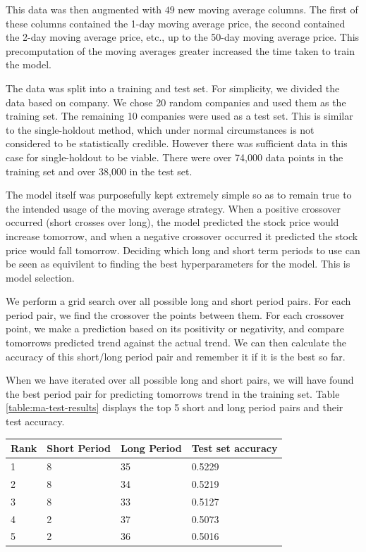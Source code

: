 \documentclass{report}
\begin{document}
This data was then augmented with $49$ new moving average columns. The first of these columns contained the 1-day moving average price, the second contained the 2-day moving average price, etc., up to the 50-day moving average price. This precomputation of the moving averages greater increased the time taken to train the model.

The data was split into a training and test set. For simplicity, we divided the data based on company. We chose 20 random companies and used them as the training set. The remaining 10 companies were used as a test set. This is similar to the single-holdout method, which under normal circumstances is not considered to be statistically credible. However there was sufficient data in this case for single-holdout to be viable. There were over 74,000 data points in the training set and over 38,000 in the test set.

The model itself was purposefully kept extremely simple so as to remain true to the intended usage of the moving average strategy. When a positive crossover occurred (short crosses over long), the model predicted the stock price would increase tomorrow, and when a negative crossover occurred it predicted the stock price would fall tomorrow. Deciding which long and short term periods to use can be seen as equivilent to finding the best hyperparameters for the model. This is model selection.

We perform a grid search over all possible long and short period pairs. For each period pair, we find the crossover the points between them. For each crossover point, we make a prediction based on its positivity or negativity, and compare tomorrows predicted trend against the actual trend. We can then calculate the accuracy of this short/long period pair and remember it if it is the best so far.

When we have iterated over all possible long and short pairs, we will have found the best period pair for predicting tomorrows trend in the training set. Table \ref{table:ma-test-results} displays the top 5 short and long period pairs and their test accuracy.


\begin{center}
    \begin{tabular}{l | l | l | l}
    Rank & Short Period & Long Period & Test set accuracy \\ \hline
    1 & 8 & 35 & 0.5229 \\ \hline
    2 & 8 & 34 & 0.5219 \\ \hline
    3 & 8 & 33 & 0.5127 \\ \hline
    4 & 2 & 37 & 0.5073 \\ \hline
    5 & 2 & 36 & 0.5016 
    \label{table:ma-test-results}
    \end{tabular}
\end{center}
\end{document}
